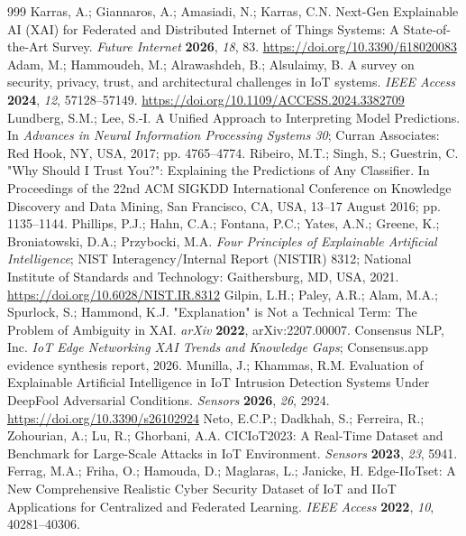 \begin{thebibliography}{999}
Karras, A.; Giannaros, A.; Amasiadi, N.; Karras, C.N. Next-Gen Explainable AI (XAI) for Federated and Distributed Internet of Things Systems: A State-of-the-Art Survey. \textit{Future Internet} \textbf{2026}, \textit{18}, 83. \url{https://doi.org/10.3390/fi18020083}
Adam, M.; Hammoudeh, M.; Alrawashdeh, B.; Alsulaimy, B. A survey on security, privacy, trust, and architectural challenges in IoT systems. \textit{IEEE Access} \textbf{2024}, \textit{12}, 57128--57149. \url{https://doi.org/10.1109/ACCESS.2024.3382709}
Lundberg, S.M.; Lee, S.-I. A Unified Approach to Interpreting Model Predictions. In \textit{Advances in Neural Information Processing Systems 30}; Curran Associates: Red Hook, NY, USA, 2017; pp. 4765--4774.
Ribeiro, M.T.; Singh, S.; Guestrin, C. "Why Should I Trust You?": Explaining the Predictions of Any Classifier. In Proceedings of the 22nd ACM SIGKDD International Conference on Knowledge Discovery and Data Mining, San Francisco, CA, USA, 13--17 August 2016; pp. 1135--1144.
Phillips, P.J.; Hahn, C.A.; Fontana, P.C.; Yates, A.N.; Greene, K.; Broniatowski, D.A.; Przybocki, M.A. \textit{Four Principles of Explainable Artificial Intelligence}; NIST Interagency/Internal Report (NISTIR) 8312; National Institute of Standards and Technology: Gaithersburg, MD, USA, 2021. \url{https://doi.org/10.6028/NIST.IR.8312}
Gilpin, L.H.; Paley, A.R.; Alam, M.A.; Spurlock, S.; Hammond, K.J. "Explanation" is Not a Technical Term: The Problem of Ambiguity in XAI. \textit{arXiv} \textbf{2022}, arXiv:2207.00007.
Consensus NLP, Inc. \textit{IoT Edge Networking XAI Trends and Knowledge Gaps}; Consensus.app evidence synthesis report, 2026.
Munilla, J.; Khammas, R.M. Evaluation of Explainable Artificial Intelligence in IoT Intrusion Detection Systems Under DeepFool Adversarial Conditions. \textit{Sensors} \textbf{2026}, \textit{26}, 2924. \url{https://doi.org/10.3390/s26102924}
Neto, E.C.P.; Dadkhah, S.; Ferreira, R.; Zohourian, A.; Lu, R.; Ghorbani, A.A. CICIoT2023: A Real-Time Dataset and Benchmark for Large-Scale Attacks in IoT Environment. \textit{Sensors} \textbf{2023}, \textit{23}, 5941.
Ferrag, M.A.; Friha, O.; Hamouda, D.; Maglaras, L.; Janicke, H. Edge-IIoTset: A New Comprehensive Realistic Cyber Security Dataset of IoT and IIoT Applications for Centralized and Federated Learning. \textit{IEEE Access} \textbf{2022}, \textit{10}, 40281--40306.

\end{thebibliography}
